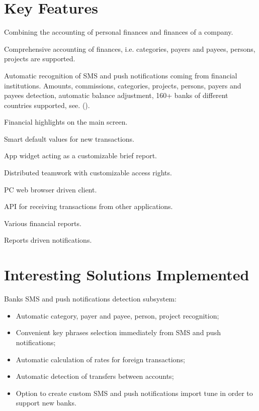 \documentclass[a4paper,10pt,english]{sphinxmanual}
\begin{document}
\section{Key Features}
\label{\detokenize{about:key-features}}
Combining the accounting of personal finances and finances of a company.

Comprehensive accounting of finances, i.e. categories, payers and payees, persons, projects are supported.

Automatic recognition of SMS and push notifications coming from financial institutions. Amounts, commissions, categories, projects, persons,
payers and payees detection, automatic balance adjustment, 160+ banks of different countries supported,
see. {\hyperref[\detokenize{banks:chapter-supported-banks}]{}} ().

Financial highlights on the main screen.

Smart default values for new transactions.

App widget acting as a customizable brief report.

Distributed teamwork with customizable access rights.

PC web browser driven client.

API for receiving transactions from other applications.

Various financial reports.

Reports driven notifications.


\section{Interesting Solutions Implemented}
\label{\detokenize{about:interesting-solutions-implemented}}
Banks SMS and push notifications detection subsystem:
\begin{itemize}
\item {} 
Automatic category, payer and payee, person, project recognition;

\item {} 
Convenient key phrases selection immediately from SMS and push notifications;

\item {} 
Automatic calculation of rates for foreign transactions;

\item {} 
Automatic detection of transfers between accounts;

\item {} 
Option to create custom SMS and push notifications import tune in order to support new banks.

\end{itemize}
\end{document}
